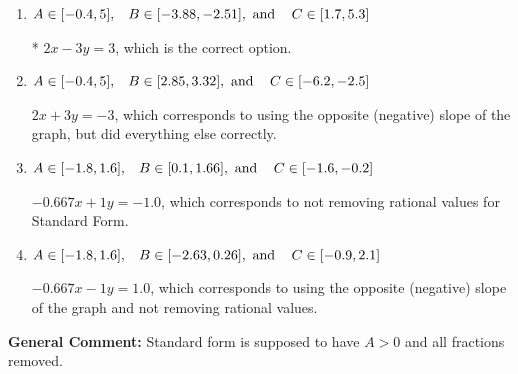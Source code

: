 \documentclass{extbook}[14pt]
\begin{document}
\begin{enumerate}
{\begin{enumerate}[label=\Alph*.]
 $-2x + 3y = -3$, which corresponds to not making $A$ positive (by multiplying the equation by $-1$).
\item \( A \in [-0.4, 5], \hspace{3mm} B \in [-3.88, -2.51], \text{ and } \hspace{3mm} C \in [1.7, 5.3] \)

* $2x - 3y = 3$, which is the correct option.
\item \( A \in [-0.4, 5], \hspace{3mm} B \in [2.85, 3.32], \text{ and } \hspace{3mm} C \in [-6.2, -2.5] \)

 $2x + 3y = -3$, which corresponds to using the opposite (negative) slope of the graph, but did everything else correctly.
\item \( A \in [-1.8, 1.6], \hspace{3mm} B \in [0.1, 1.66], \text{ and } \hspace{3mm} C \in [-1.6, -0.2] \)

 $-0.667x + 1y = -1.0$, which corresponds to not removing rational values for Standard Form.
\item \( A \in [-1.8, 1.6], \hspace{3mm} B \in [-2.63, 0.26], \text{ and } \hspace{3mm} C \in [-0.9, 2.1] \)

 $-0.667x - 1y = 1.0$, which corresponds to using the opposite (negative) slope of the graph and not removing rational values.
\end{enumerate}

\textbf{General Comment:} Standard form is supposed to have $A > 0$ and all fractions removed.
}
\end{enumerate}
\end{document}

